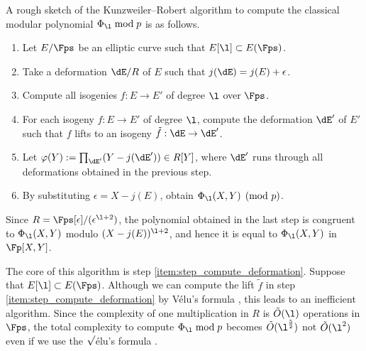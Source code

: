 \documentclass{amsart}
\theoremstyle{definition}
\theoremstyle{remark}
\numberwithin{equation}{section}
\begin{document}
A rough sketch of the Kunzweiler--Robert algorithm to compute
the classical modular polynomial $\Phi_{\l} \bmod p$ is as follows.
\begin{enumerate}
    \item Let $E/\Fps$ be an elliptic curve such that $E[\l]\subset E(\Fps)$.
    \item Take a deformation $\dE/R$ of $E$ such that $j(\dE)=j(E)+\epsilon$.
    \item Compute all isogenies $f:E\to E'$ of degree $\l$ over $\Fps$.
    \item For each isogeny $f:E\to E'$ of degree $\l$, compute the deformation $\dE'$ of $E'$ such that $f$ lifts to an isogeny $\tilde{f}:\dE\to \dE'$.
        \label{item:step_compute_deformation} 
    \item Let $\varphi(Y):=\prod_{\dE'}(Y-j(\dE'))\in R[Y]$, where $\dE'$ runs through all deformations obtained in the previous step.
    \item By substituting $\epsilon=X-j(E)$, obtain $\Phi_{\l}(X,Y) \pmod p$.
\end{enumerate}
Since $R=\Fps[\epsilon]/(\epsilon^{\l+2})$,
the polynomial obtained in the last step is
congruent to $\Phi_{\l}(X,Y)$ modulo $(X-j(E))^{\l+2}$,
and hence it is equal to $\Phi_{\l}(X,Y)$ in $\Fp[X,Y]$.

The core of this algorithm is step \ref{item:step_compute_deformation}.
Suppose that $E[\l] \subset E(\Fps)$.
Although we can compute the lift $\tilde{f}$ in step \ref{item:step_compute_deformation}
by V\'elu's formula \cite{Velu1971},
this leads to an inefficient algorithm.
Since the complexity of one multiplication in $R$ is $\tilde{O}(\l)$ operations in $\Fps$,
the total complexity to compute $\Phi_{\l} \bmod p$
becomes $\tilde{O}(\l^{\frac{5}{2}})$ not $\tilde{O}(\l^2)$
even if we use the $\sqrt{\vphantom{l}}$\'elu's formula \cite{BFLS2020}.
\end{document}
